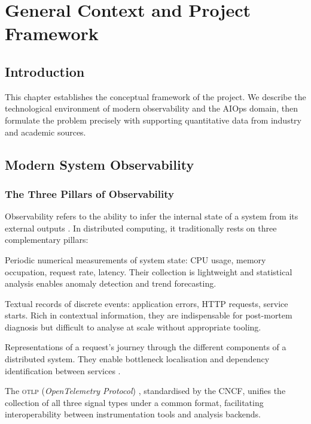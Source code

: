 \chapter{General Context and Project Framework}

\section*{Introduction}

This chapter establishes the conceptual framework of the \caimp{} project.
We describe the technological environment of modern observability and the AIOps
domain, then formulate the problem precisely with supporting quantitative data
from industry and academic sources.

\section{Modern System Observability}

\subsection{The Three Pillars of Observability}

Observability refers to the ability to infer the internal state of a system
from its external outputs \cite{brendangregg2020}. In distributed computing,
it traditionally rests on three complementary pillars:

\begin{description}[leftmargin=2cm, style=nextline]
  \item[Metrics] Periodic numerical measurements of system state: CPU usage,
    memory occupation, request rate, latency. Their collection is lightweight
    and statistical analysis enables anomaly detection and trend forecasting.
  \item[Logs] Textual records of discrete events: application errors, HTTP
    requests, service starts. Rich in contextual information, they are
    indispensable for post-mortem diagnosis but difficult to analyse at scale
    without appropriate tooling.
  \item[Traces] Representations of a request's journey through the different
    components of a distributed system. They enable bottleneck localisation
    and dependency identification between services \cite{sigelman2010dapper}.
\end{description}

The \textsc{otlp} (\textit{OpenTelemetry Protocol}) \cite{otlp_spec},
standardised by the CNCF, unifies the collection of all three signal types
under a common format, facilitating interoperability between instrumentation
tools and analysis backends.

